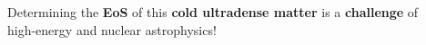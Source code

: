 \begin{frame}
\begin{columns}[c]
\begin{column}{0.65\textwidth}
\begin{enumerate}
{ \quad
 
 \item Determining the {\bf EoS} of this {\bf cold ultradense matter} is a {\bf challenge} of high-energy and nuclear astrophysics!

 }
 
\end{enumerate}
\end{column}
\begin{column}{0.5\textwidth}    
\end{column}
\end{columns} 
\end{frame}







